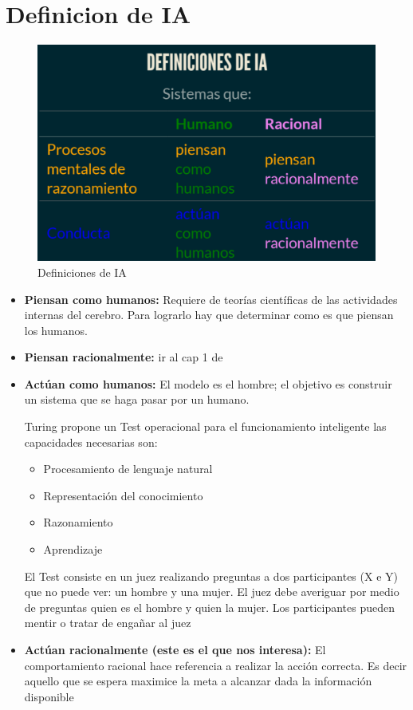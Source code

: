 \section{Definicion de IA}

\begin{figure}
  \centering
  \includegraphics[width=16cm, scale=1]{Images/Imagenes/cuadro1.png}
  \caption{Definiciones de IA}
  \label{fig:marcado}
\end{figure}

\begin{itemize}
  \item \textbf{Piensan como humanos:} Requiere de teorías científicas de las actividades internas del cerebro. Para lograrlo hay que determinar como es que piensan los humanos.
  \item \textbf{Piensan racionalmente:} ir al cap 1 de \cite{sabharwal2011s}
  \item \textbf{Actúan como humanos: }El modelo es el hombre; el objetivo es construir un sistema que se haga pasar por un humano.
  
  Turing propone un Test operacional para el funcionamiento inteligente las capacidades necesarias son:
  \begin{itemize}
    \item Procesamiento de lenguaje natural
    \item Representación del conocimiento
    \item Razonamiento
    \item Aprendizaje
  \end{itemize}
  El Test consiste en un juez realizando preguntas a dos participantes (X e Y) que no puede ver: un hombre y una mujer. El juez debe averiguar por medio de preguntas quien es el hombre y quien la mujer. Los participantes pueden mentir o tratar de engañar al juez
  \item \textbf{Actúan racionalmente (este es el que nos interesa):} El comportamiento racional hace referencia a realizar la acción correcta. Es decir aquello que se espera maximice la meta a alcanzar dada la información disponible
\end{itemize}

